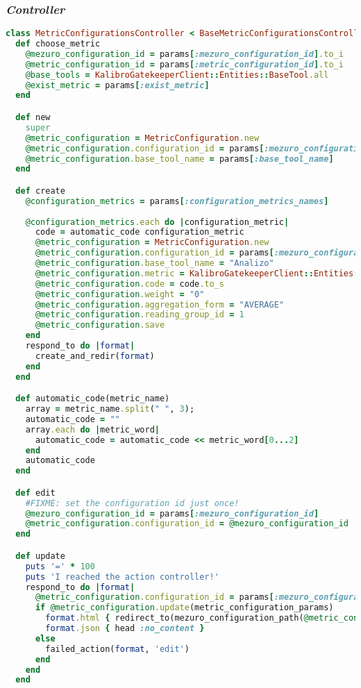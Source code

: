 \subsubsection{\textit{Controller}}
\begin{lstlisting}[language=Ruby]
class MetricConfigurationsController < BaseMetricConfigurationsController
  def choose_metric
    @mezuro_configuration_id = params[:mezuro_configuration_id].to_i
    @metric_configuration_id = params[:metric_configuration_id].to_i
    @base_tools = KalibroGatekeeperClient::Entities::BaseTool.all
    @exist_metric = params[:exist_metric]
  end

  def new
    super
    @metric_configuration = MetricConfiguration.new
    @metric_configuration.configuration_id = params[:mezuro_configuration_id].to_i
    @metric_configuration.base_tool_name = params[:base_tool_name]
  end

  def create
    @configuration_metrics = params[:configuration_metrics_names]
    
    @configuration_metrics.each do |configuration_metric|
      code = automatic_code configuration_metric
      @metric_configuration = MetricConfiguration.new
      @metric_configuration.configuration_id = params[:mezuro_configuration_id].to_i
      @metric_configuration.base_tool_name = "Analizo"
      @metric_configuration.metric = KalibroGatekeeperClient::Entities::BaseTool.find_by_name("Analizo").metric(configuration_metric.to_s)
      @metric_configuration.code = code.to_s
      @metric_configuration.weight = "0"
      @metric_configuration.aggregation_form = "AVERAGE"
      @metric_configuration.reading_group_id = 1
      @metric_configuration.save
    end
    respond_to do |format|
      create_and_redir(format)
    end    
  end

  def automatic_code(metric_name)
    array = metric_name.split(" ", 3);
    automatic_code = ""
    array.each do |metric_word|
      automatic_code = automatic_code << metric_word[0...2]
    end
    automatic_code
  end

  def edit
    #FIXME: set the configuration id just once!
    @mezuro_configuration_id = params[:mezuro_configuration_id]
    @metric_configuration.configuration_id = @mezuro_configuration_id
  end

  def update
    puts '=' * 100
    puts 'I reached the action controller!'
    respond_to do |format|
      @metric_configuration.configuration_id = params[:mezuro_configuration_id]
      if @metric_configuration.update(metric_configuration_params)
        format.html { redirect_to(mezuro_configuration_path(@metric_configuration.configuration_id), notice: 'Metric Configuration was successfully updated.') }
        format.json { head :no_content }
      else
        failed_action(format, 'edit')
      end
    end
  end


\end{lstlisting}
